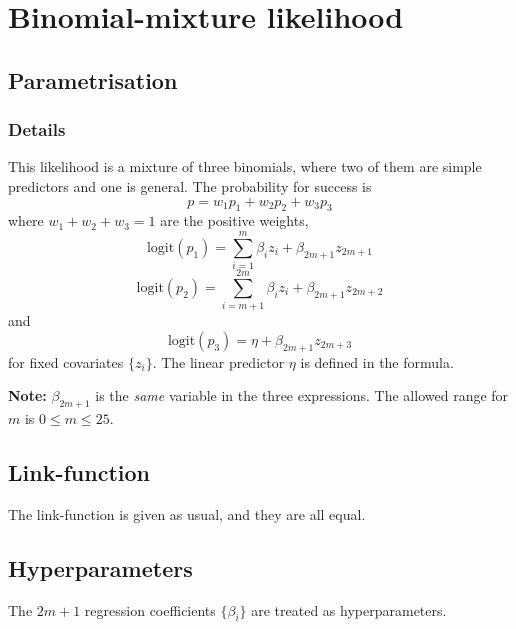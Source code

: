 \documentclass[a4paper,11pt]{article}
\begin{document}
\section*{Binomial-mixture likelihood}

\subsection*{Parametrisation}

\subsubsection*{Details}

This likelihood is a mixture of three binomials, where two of them are
simple predictors and one is general. The probability for success is
\begin{displaymath}
    p = w_1 p_1 + w_2 p_2 + w_3 p_3
\end{displaymath}
where $w_1 + w_2 + w_3 = 1$ are the positive weights,
\begin{displaymath}
    \text{logit}(p_1) = \sum_{i=1}^{m}\beta_{i} z_{i} + \beta_{2m+1} z_{2m+1}
\end{displaymath}
\begin{displaymath}
    \text{logit}(p_2) = \sum_{i=m+1}^{2m}\beta_{i} z_{i} + \beta_{2m+1} z_{2m+2}
\end{displaymath}
and
\begin{displaymath}
    \text{logit}(p_3) = \eta + \beta_{2m+1} z_{2m+3}
\end{displaymath}
for fixed covariates $\{z_{i}\}$.
The linear predictor $\eta$ is defined in the formula.

\textbf{Note:} $\beta_{2m+1}$ is the \emph{same} variable in the three
expressions. The allowed range for $m$ is $0\le m \le 25$.

\subsection*{Link-function}

The link-function is given as usual, and they are all equal.

\subsection*{Hyperparameters}

The $2m+1$ regression coefficients $\{\beta_{i}\}$ are treated as
hyperparameters. 
\end{document}
